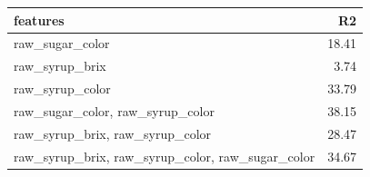 \begin{longtable}{lr}
\hline
 features                                               &    R2 \\
\hline
 raw\_sugar\_color                                      & 18.41 \\
 raw\_syrup\_brix                                       &  3.74 \\
 raw\_syrup\_color                                      & 33.79 \\
 raw\_sugar\_color, raw\_syrup\_color                   & 38.15 \\
 raw\_syrup\_brix, raw\_syrup\_color                    & 28.47 \\
 raw\_syrup\_brix, raw\_syrup\_color, raw\_sugar\_color & 34.67 \\
\hline
\end{longtable}
